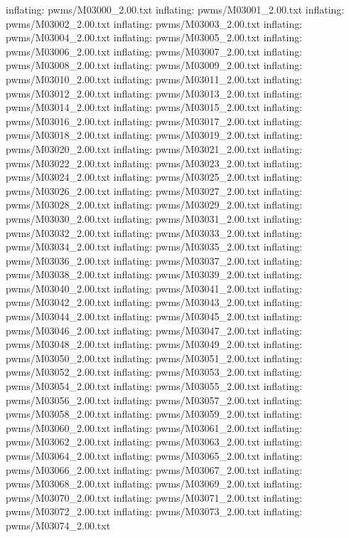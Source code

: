 \documentclass[letterpaper,10pt,english]{sphinxmanual}
\begin{document}
{\begin{sphinxVerbatim}[commandchars=\\\{\}]
  inflating: pwms/M03000\_2.00.txt
  inflating: pwms/M03001\_2.00.txt
  inflating: pwms/M03002\_2.00.txt
  inflating: pwms/M03003\_2.00.txt
  inflating: pwms/M03004\_2.00.txt
  inflating: pwms/M03005\_2.00.txt
  inflating: pwms/M03006\_2.00.txt
  inflating: pwms/M03007\_2.00.txt
  inflating: pwms/M03008\_2.00.txt
  inflating: pwms/M03009\_2.00.txt
  inflating: pwms/M03010\_2.00.txt
  inflating: pwms/M03011\_2.00.txt
  inflating: pwms/M03012\_2.00.txt
  inflating: pwms/M03013\_2.00.txt
  inflating: pwms/M03014\_2.00.txt
  inflating: pwms/M03015\_2.00.txt
  inflating: pwms/M03016\_2.00.txt
  inflating: pwms/M03017\_2.00.txt
  inflating: pwms/M03018\_2.00.txt
  inflating: pwms/M03019\_2.00.txt
  inflating: pwms/M03020\_2.00.txt
  inflating: pwms/M03021\_2.00.txt
  inflating: pwms/M03022\_2.00.txt
  inflating: pwms/M03023\_2.00.txt
  inflating: pwms/M03024\_2.00.txt
  inflating: pwms/M03025\_2.00.txt
  inflating: pwms/M03026\_2.00.txt
  inflating: pwms/M03027\_2.00.txt
  inflating: pwms/M03028\_2.00.txt
  inflating: pwms/M03029\_2.00.txt
  inflating: pwms/M03030\_2.00.txt
  inflating: pwms/M03031\_2.00.txt
  inflating: pwms/M03032\_2.00.txt
  inflating: pwms/M03033\_2.00.txt
  inflating: pwms/M03034\_2.00.txt
  inflating: pwms/M03035\_2.00.txt
  inflating: pwms/M03036\_2.00.txt
  inflating: pwms/M03037\_2.00.txt
  inflating: pwms/M03038\_2.00.txt
  inflating: pwms/M03039\_2.00.txt
  inflating: pwms/M03040\_2.00.txt
  inflating: pwms/M03041\_2.00.txt
  inflating: pwms/M03042\_2.00.txt
  inflating: pwms/M03043\_2.00.txt
  inflating: pwms/M03044\_2.00.txt
  inflating: pwms/M03045\_2.00.txt
  inflating: pwms/M03046\_2.00.txt
  inflating: pwms/M03047\_2.00.txt
  inflating: pwms/M03048\_2.00.txt
  inflating: pwms/M03049\_2.00.txt
  inflating: pwms/M03050\_2.00.txt
  inflating: pwms/M03051\_2.00.txt
  inflating: pwms/M03052\_2.00.txt
  inflating: pwms/M03053\_2.00.txt
  inflating: pwms/M03054\_2.00.txt
  inflating: pwms/M03055\_2.00.txt
  inflating: pwms/M03056\_2.00.txt
  inflating: pwms/M03057\_2.00.txt
  inflating: pwms/M03058\_2.00.txt
  inflating: pwms/M03059\_2.00.txt
  inflating: pwms/M03060\_2.00.txt
  inflating: pwms/M03061\_2.00.txt
  inflating: pwms/M03062\_2.00.txt
  inflating: pwms/M03063\_2.00.txt
  inflating: pwms/M03064\_2.00.txt
  inflating: pwms/M03065\_2.00.txt
  inflating: pwms/M03066\_2.00.txt
  inflating: pwms/M03067\_2.00.txt
  inflating: pwms/M03068\_2.00.txt
  inflating: pwms/M03069\_2.00.txt
  inflating: pwms/M03070\_2.00.txt
  inflating: pwms/M03071\_2.00.txt
  inflating: pwms/M03072\_2.00.txt
  inflating: pwms/M03073\_2.00.txt
  inflating: pwms/M03074\_2.00.txt

\end{sphinxVerbatim}}
\end{document}
